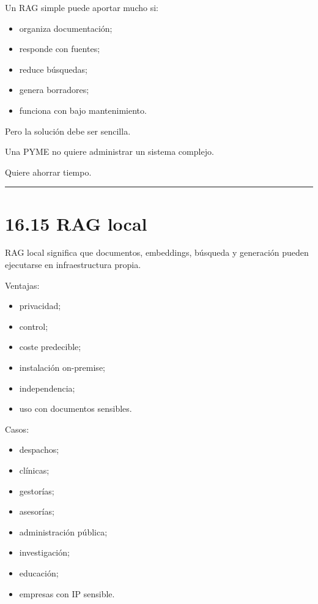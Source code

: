 Un RAG simple puede aportar mucho si:

\begin{itemize}
\tightlist
\item
  organiza documentación;
\item
  responde con fuentes;
\item
  reduce búsquedas;
\item
  genera borradores;
\item
  funciona con bajo mantenimiento.
\end{itemize}

Pero la solución debe ser sencilla.

Una PYME no quiere administrar un sistema complejo.

Quiere ahorrar tiempo.

\begin{center}\rule{0.5\linewidth}{0.5pt}\end{center}

\section{16.15 RAG local}\label{rag-local}

RAG local significa que documentos, embeddings, búsqueda y generación
pueden ejecutarse en infraestructura propia.

Ventajas:

\begin{itemize}
\tightlist
\item
  privacidad;
\item
  control;
\item
  coste predecible;
\item
  instalación on-premise;
\item
  independencia;
\item
  uso con documentos sensibles.
\end{itemize}

Casos:

\begin{itemize}
\tightlist
\item
  despachos;
\item
  clínicas;
\item
  gestorías;
\item
  asesorías;
\item
  administración pública;
\item
  investigación;
\item
  educación;
\item
  empresas con IP sensible.
\end{itemize}


